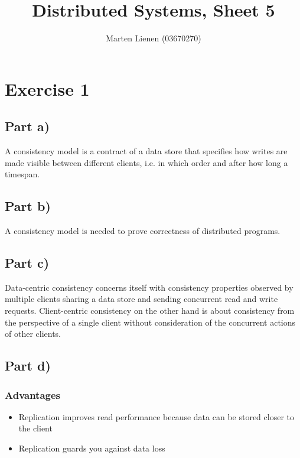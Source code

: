 \documentclass[10pt,a4paper]{article}
\title{Distributed Systems, Sheet 5}
\author{Marten Lienen (03670270)}
\begin{document}
\maketitle

\section*{Exercise 1}

\subsection*{Part a)}

A consistency model is a contract of a data store that specifies how writes are made visible between different clients, i.e. in which order and after how long a timespan.

\subsection*{Part b)}

A consistency model is needed to prove correctness of distributed programs.

\subsection*{Part c)}

Data-centric consistency concerns itself with consistency properties observed by multiple clients sharing a data store and sending concurrent read and write requests.
Client-centric consistency on the other hand is about consistency from the perspective of a single client without consideration of the concurrent actions of other clients.

\subsection*{Part d)}

\subsubsection*{Advantages}

\begin{itemize}
\item Replication improves read performance because data can be stored closer to the client
\item Replication guards you against data loss
\end{itemize}
\end{document}
